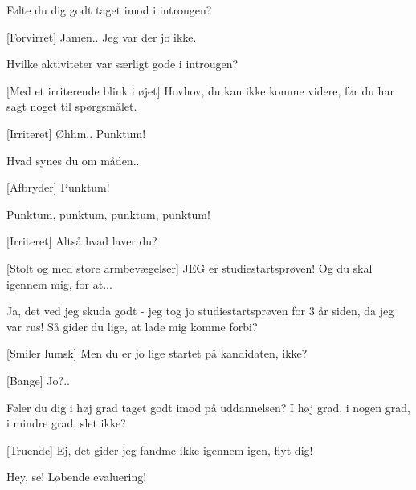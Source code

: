 \documentclass[a4paper,11pt]{article}
\begin{document}
\begin{sketch}
 Følte du dig godt taget imod i introugen?

[Forvirret] Jamen.. Jeg var der jo ikke.

 Hvilke aktiviteter var særligt gode i introugen?


[Med et irriterende blink i øjet] Hovhov, du kan ikke komme videre, før du har sagt noget til spørgsmålet.

[Irriteret] Øhhm.. Punktum!


 Hvad synes du om måden..

[Afbryder] Punktum!


 Punktum, punktum, punktum, punktum!


[Irriteret] Altså hvad laver du?

[Stolt og med store armbevægelser] JEG er studiestartsprøven! Og du skal igennem mig, for at...

 Ja, det ved jeg skuda godt - jeg tog jo studiestartsprøven for 3 år siden, da jeg var rus! Så gider du lige, at lade mig komme forbi?

[Smiler lumsk] Men du er jo lige startet på kandidaten, ikke?

[Bange] Jo?..


 Føler du dig i høj grad taget godt imod på uddannelsen? I høj grad, i nogen grad, i mindre grad, slet ikke?

[Truende] Ej, det gider jeg fandme ikke igennem igen, flyt dig!


 Hey, se! Løbende evaluering!
\end{sketch}
\end{document}
